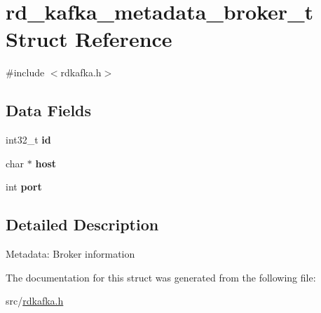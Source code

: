 \hypertarget{structrd__kafka__metadata__broker__t}{\section{rd\-\_\-kafka\-\_\-metadata\-\_\-broker\-\_\-t Struct Reference}
\label{structrd__kafka__metadata__broker__t}
}


{\ttfamily \#include $<$rdkafka.\-h$>$}

\subsection*{Data Fields}
\begin{DoxyCompactItemize}
\item 
\hypertarget{structrd__kafka__metadata__broker__t_a4429aaa53ac19ed33856323242899f9c}{int32\-\_\-t {\bfseries id}}\label{structrd__kafka__metadata__broker__t_a4429aaa53ac19ed33856323242899f9c}

\item 
\hypertarget{structrd__kafka__metadata__broker__t_a793daa60734030950ef9abdc97220284}{char $\ast$ {\bfseries host}}\label{structrd__kafka__metadata__broker__t_a793daa60734030950ef9abdc97220284}

\item 
\hypertarget{structrd__kafka__metadata__broker__t_a669f85d48fd084f36a47f2654115b165}{int {\bfseries port}}\label{structrd__kafka__metadata__broker__t_a669f85d48fd084f36a47f2654115b165}

\end{DoxyCompactItemize}


\subsection{Detailed Description}
Metadata\-: Broker information 

The documentation for this struct was generated from the following file\-:\begin{DoxyCompactItemize}
\item 
src/\hyperlink{rdkafka_8h}{rdkafka.\-h}\end{DoxyCompactItemize}
